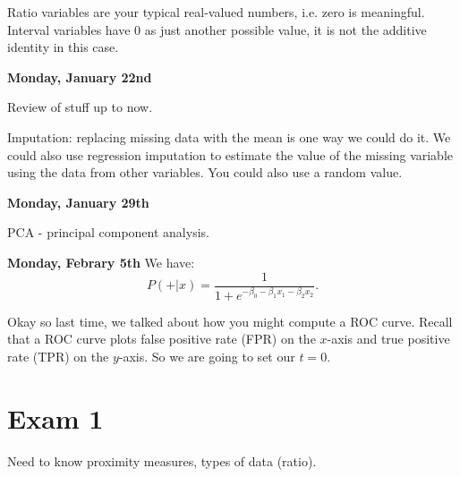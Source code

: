 \documentclass{amsbook}
\theoremstyle{plain}
\theoremstyle{definition}
\theoremstyle{remark}
\newcommand{\fracc}{\frac}
\begin{document}
Ratio variables are your typical real-valued numbers, i.e. zero is meaningful. Interval variables have 0 as just another possible value, it is not the additive identity in this case. 


\textbf{Monday, January 22nd}

Review of stuff up to now. 


Imputation: replacing missing data with the mean is one way we could do it. We could also use regression imputation to estimate the value of the missing variable using the data from other variables. You could also use a random value. 

\textbf{Monday, January 29th}

PCA - principal component analysis. 

\textbf{Monday, Febrary 5th}
We have: 
$$
P(+ | x) = \fracc{1}{1 + e^{-\beta_0 - \beta_1x_1 - \beta_2x_2}}.
$$

Okay so last time, we talked about how you might compute a ROC curve. Recall that a ROC curve plots false positive rate (FPR) on the $x$-axis and true positive rate (TPR) on the $y$-axis. So we are going to set our $t = 0$.



\section{Exam 1}

Need to know proximity measures, types of data (ratio). 
\end{document}
